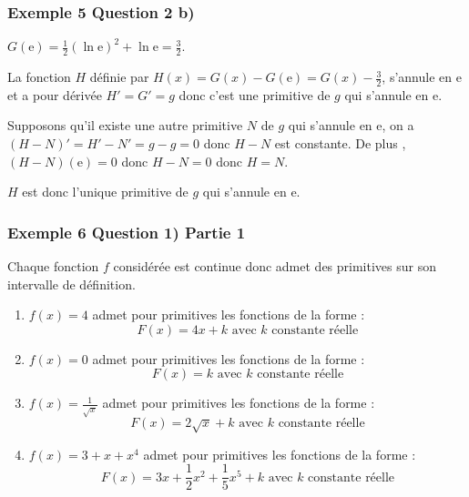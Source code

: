 \documentclass[11pt, hyperref={urlcolor=red,%
            linkcolor=blue, %
            colorlinks=true}]{beamer}
\begin{document}
\begin{frame}
\frametitle{Exemple 5 Question 2 b)}


$G(\text{e})=\frac{1}{2}\left(\ln \text{e} \right)^{2}+\ln \text{e} = \frac{3}{2}$.

La fonction $H$ définie par $H(x)=G(x) - G(\text{e}) = G(x) - \frac{3}{2}$, s'annule en $\text{e}$ et a pour dérivée $H'=G'=g$ donc c'est une primitive de $g$ qui s'annule en $\text{e}$.

Supposons  qu'il existe une autre primitive $N$ de $g$ qui s'annule en $\text{e}$, on a $(H-N)'=H'-N'=g-g=0$ donc $H-N$ est constante. De plus , $(H-N)(\text{e})=0$ donc $H-N=0$ donc $H=N$.

$H$ est donc l'unique primitive de $g$ qui s'annule en $\text{e}$.

\end{frame}


\begin{frame}
\frametitle{Exemple 6 Question 1) Partie 1}
\label{exemple6}
\renewcommand{\theenumi}{\alph{enumi}}
Chaque fonction $f$ considérée est continue donc admet des primitives sur son intervalle de définition.

\begin{enumerate}
 \item $f(x)= 4$ admet pour primitives les fonctions de la forme :
 $$F(x)=4x+k \text{ avec } k \text{ constante réelle}$$
 
  \item $f(x)= 0$ admet pour primitives les fonctions de la forme :
 $$F(x)=k \text{ avec } k \text{ constante réelle}$$
	
  \item  $f(x)= \frac{1}{\sqrt{x}}$ admet pour primitives les fonctions de la forme :
 $$F(x)= 2 \sqrt{x} + k \text{ avec } k \text{ constante réelle}$$
 
   \item  $f(x)= 3+x+x^4$ admet pour primitives les fonctions de la forme :
 $$F(x)=3x+\frac{1}{2}x^{2} + \frac{1}{5}x^{5} + k \text{ avec } k \text{ constante réelle}$$
 
 	
			  

\end{enumerate}

\end{frame}
\end{document}
